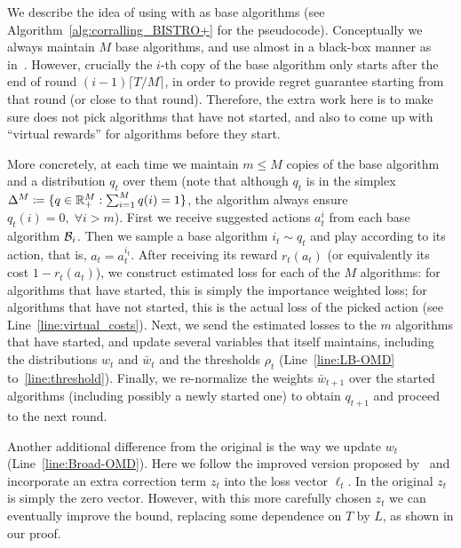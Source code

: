 We describe the idea of using \corral with \bistro as base algorithms
(see Algorithm~\ref{alg:corralling_BISTRO+} for the pseudocode).
Conceptually we always maintain $M$ base algorithms,
and use \corral almost in a black-box manner as in~\citep{AgarwalLuNeSc17}.
However, crucially the $i$-th copy of the base algorithm only starts
after the end of round $(i-1) \lceil T/M\rceil$, in order to provide regret guarantee
starting from that round (or close to that round).
Therefore, the extra work here is to make sure \corral does not pick algorithms
that have not started, and also to come up with ``virtual rewards'' for algorithms
before they start.

More concretely, at each time we maintain $m \leq M$ copies of the base algorithm 
and a distribution $q_t$ over them
(note that although $q_t$ is in the simplex $\Delta^M \coloneqq \{q \in \mathbb{R}^M_+: \sum_{i=1}^M q(i)=1 \}$, 
the algorithm always ensure $q_t(i) = 0, \;\forall i > m$). 
First we receive suggested actions $a_t^i$ from each base algorithm ${{\cal{B}}_{i}}$.
Then we sample a base algorithm $i_t \sim q_t$ and play according to its action, that is, $a_t = a_t^{i_t}$.
After receiving its reward $r_t(a_t)$ (or equivalently its cost $1-r_t(a_t)$), 
we construct estimated loss for each of the $M$ algorithms:
for algorithms that have started, this is simply the importance weighted loss;
for algorithms that have not started, this is the actual loss of the picked action (see Line~\ref{line:virtual_costs}).
Next, we send the estimated losses to the $m$ algorithms that have started,
and update several variables that \corral itself maintains, 
including the distributions $w_t$ and $\bar{w}_t$ and the thresholds $\rho_t$ (Line~\ref{line:LB-OMD} to~\ref{line:threshold}).
Finally, we re-normalize the weights $\bar{w}_{t+1}$ over the started algorithms
(including possibly a newly started one) to obtain $q_{t+1}$ and proceed to the next round.

Another additional difference from the original \corral is the way we update $w_t$ (Line~\ref{line:Broad-OMD}).
Here we follow the improved version proposed by~\citet{wei2018more} and incorporate an extra correction term $z_t$ into the loss vector $\ell_t$.
In the original \corral $z_t$ is simply the zero vector.
However, with this more carefully chosen $z_t$ we can eventually improve the bound, replacing some dependence on $T$ by $L$,
as shown in our proof.

~

